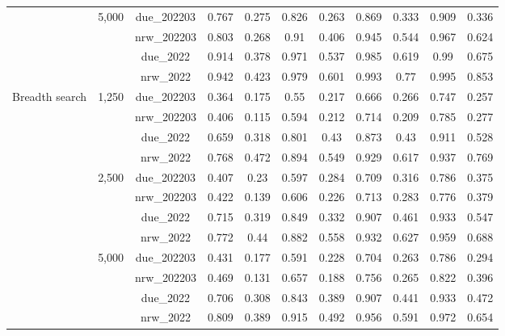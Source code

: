 \begin{table}[ht!]
{\begin{tabular}{c|c|c|c|c|c|c|c|c|c|c}
                &5,000 & due\_202203 & 0.767 & 0.275 & 0.826 & 0.263 & 0.869 & 0.333 & 0.909 & 0.336 \\
                 \cline{3-11}
                && nrw\_202203 & 0.803 & 0.268 & 0.91 & 0.406 & 0.945 & 0.544 & 0.967 & 0.624 \\
                 \cline{3-11}
                && due\_2022 & 0.914 & 0.378 & 0.971 & 0.537 & 0.985 & 0.619 & 0.99 & 0.675 \\
                 \cline{3-11}
                && nrw\_2022 & 0.942 & 0.423 & 0.979 & 0.601 & 0.993 & 0.77 & 0.995 & 0.853 \\
                \hline
                \hline    
                Breadth search&1,250 & due\_202203 & 0.364 & 0.175 & 0.55 & 0.217 & 0.666 & 0.266 & 0.747 & 0.257  \\
                 \cline{3-11}
                && nrw\_202203 & 0.406 & 0.115 & 0.594 & 0.212 & 0.714 & 0.209 & 0.785 & 0.277 \\
                 \cline{3-11}
                && due\_2022 & 0.659 & 0.318 & 0.801 & 0.43 & 0.873 & 0.43 & 0.911 & 0.528 \\
                 \cline{3-11}
                && nrw\_2022 & 0.768 & 0.472 & 0.894 & 0.549 & 0.929 & 0.617 & 0.937 & 0.769 \\
                \cline{2-11}        
                &2,500 & due\_202203 & 0.407 & 0.23 & 0.597 & 0.284 & 0.709 & 0.316 & 0.786 & 0.375 \\
                \cline{3-11}
                && nrw\_202203 & 0.422 & 0.139 & 0.606 & 0.226 & 0.713 & 0.283 & 0.776 & 0.379 \\
                \cline{3-11}
                && due\_2022 & 0.715 & 0.319 & 0.849 & 0.332 & 0.907 & 0.461 & 0.933 & 0.547 \\
                 \cline{3-11}
                && nrw\_2022 & 0.772 & 0.44 & 0.882 & 0.558 & 0.932 & 0.627 & 0.959 & 0.688  \\
                \cline{2-11}        
                &5,000 & due\_202203 & 0.431 & 0.177 & 0.591 & 0.228 & 0.704 & 0.263 & 0.786 & 0.294 \\
                 \cline{3-11}
                && nrw\_202203 & 0.469 & 0.131 & 0.657 & 0.188 & 0.756 & 0.265 & 0.822 & 0.396 \\
                 \cline{3-11}
                && due\_2022 & 0.706 & 0.308 & 0.843 & 0.389 & 0.907 & 0.441 & 0.933 & 0.472 \\
                 \cline{3-11}
                && nrw\_2022 & 0.809 & 0.389 & 0.915 & 0.492 & 0.956 & 0.591 & 0.972 & 0.654 \\
            \end{tabular}  
            }    
        \end{table}
        \clearpage
\setcounter{table}{0}
